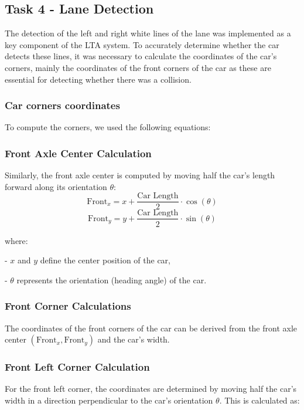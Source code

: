 \documentclass[12pt]{article}
\begin{document}
\subsection{Task 4 - Lane Detection}

The detection of the left and right white lines of the lane was implemented as a key component of the LTA system. To accurately determine whether the car detects these lines, it was necessary to calculate the coordinates of the car's corners, mainly the coordinates of the front corners of the car as these are essential for detecting whether there was a collision.
\subsubsection{Car corners coordinates}
To compute the corners, we used the following equations:

\subsubsection*{Front Axle Center Calculation}  

Similarly, the front axle center is computed by moving half the car's length forward along its orientation \(\theta\):  
\[
\text{Front}_x = x + \frac{\text{Car Length}}{2} \cdot \cos(\theta)
\]  
\[
\text{Front}_y = y + \frac{\text{Car Length}}{2} \cdot \sin(\theta)
\]

where:  

- \(x\) and \(y\) define the center position of the car,  

- \(\theta\) represents the orientation (heading angle) of the car.

\subsubsection*{Front Corner Calculations}

The coordinates of the front corners of the car can be derived from the front axle center \((\text{Front}_x, \text{Front}_y)\) and the car's width.

\subsubsection*{Front Left Corner Calculation}

For the front left corner, the coordinates are determined by moving half the car's width in a direction perpendicular to the car's orientation \(\theta\). This is calculated as:
\end{document}
